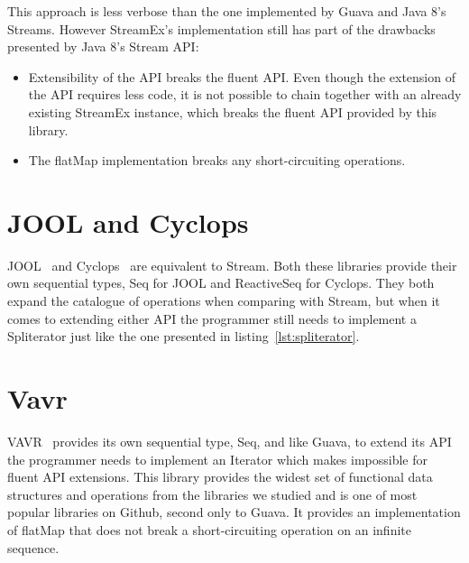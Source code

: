 \newpage


This approach is less verbose than the one implemented by Guava and Java 8's Streams. However StreamEx's implementation still has part of the drawbacks presented by Java 8's Stream API:
\begin{itemize}
\item Extensibility of the API breaks the fluent API.
Even though the extension of the API requires less code, it is not possible to chain together with an already existing StreamEx instance, which breaks the fluent API provided by this library.
\item The flatMap implementation breaks any short-circuiting operations.
\end{itemize}



\section{JOOL and Cyclops}

JOOL~\citep{jool} and Cyclops~\citep{cyclops} are equivalent to Stream. Both these libraries provide their own sequential types, Seq for JOOL and ReactiveSeq for Cyclops. They both expand the catalogue of operations when comparing with Stream, but when it comes to extending either API the programmer still needs to implement a Spliterator just like the one presented in listing~\ref{lst:spliterator}.

\section{Vavr}

VAVR~\citep{vavr} provides its own sequential type, Seq, and like Guava, to extend its API the programmer needs to implement an Iterator which makes impossible for fluent API extensions. This library provides the widest set of functional data structures and operations from the libraries we studied and is one of most popular libraries on Github, second only to Guava. It provides an implementation of flatMap that does not break a short-circuiting operation on an infinite sequence. 